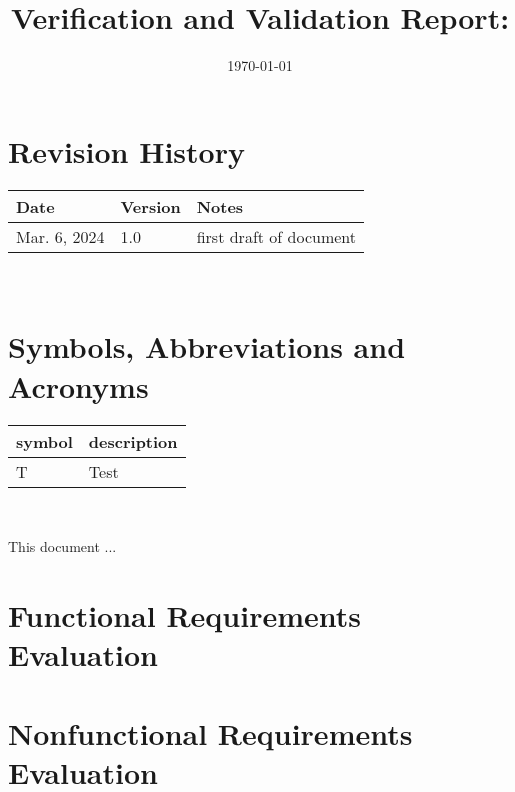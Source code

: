 \documentclass[12pt, titlepage]{article}
\begin{document}
\title{Verification and Validation Report: \progname} 
\author{\authname}
\date{\today}
	
\maketitle


\section{Revision History}

\begin{tabularx}{\textwidth}{p{3cm}p{2cm}X}
\toprule {\bf Date} & {\bf Version} & {\bf Notes}\\
\midrule
Mar. 6, 2024 & 1.0 & first draft of document\\
\bottomrule
\end{tabularx}

~\newpage

\section{Symbols, Abbreviations and Acronyms}

\renewcommand{\arraystretch}{1.2}
\begin{tabular}{l l} 
  \toprule		
  \textbf{symbol} & \textbf{description}\\
  \midrule 
  T & Test\\
  \bottomrule
\end{tabular}\\


\newpage

\tableofcontents

\listoftables %

\listoffigures %

\newpage


This document ...

\section{Functional Requirements Evaluation}

\section{Nonfunctional Requirements Evaluation}
\end{document}
